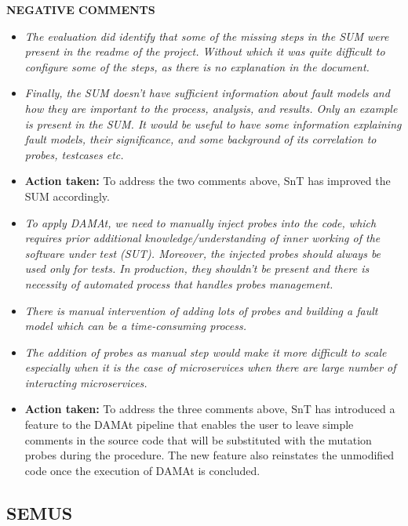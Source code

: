 \textbf{NEGATIVE COMMENTS}

\begin{itemize}

  \item \emph{The evaluation did identify that some of the missing steps in the SUM were present in the readme of the project. Without which it was quite difficult to configure some of the steps, as there is no explanation in the document.}

  \item \emph{Finally, the SUM doesn’t have sufficient information about fault models and how they are important to the process, analysis, and results. Only an example is present in the SUM. It would be useful to have some information explaining fault models, their significance, and some background of its correlation to probes, testcases etc.}

  \item \textbf{Action taken:} To address the two comments above, SnT has improved the SUM accordingly.

  \item \emph{To apply DAMAt, we need to manually inject probes into the code, which requires prior additional knowledge/understanding of inner working of the software under test (SUT). Moreover, the injected probes should always be used only for tests. In production, they shouldn’t be present and there is necessity of automated process that handles probes management.}

  \item \emph{There is manual intervention of adding lots of probes and building a fault model which can be a time-consuming process.}

  \item \emph{The addition of probes as manual step would make it more difficult to scale especially when it is the case of microservices when there are large number of interacting microservices.}

  \item \textbf{Action taken:} To address the three comments above, SnT has introduced a feature to the DAMAt pipeline that enables the user to leave simple comments in the source code that will be substituted with the mutation probes during the procedure. The new feature also reinstates the unmodified code once the execution of DAMAt is concluded.

\end{itemize}

\subsection{SEMUS} \ \\

